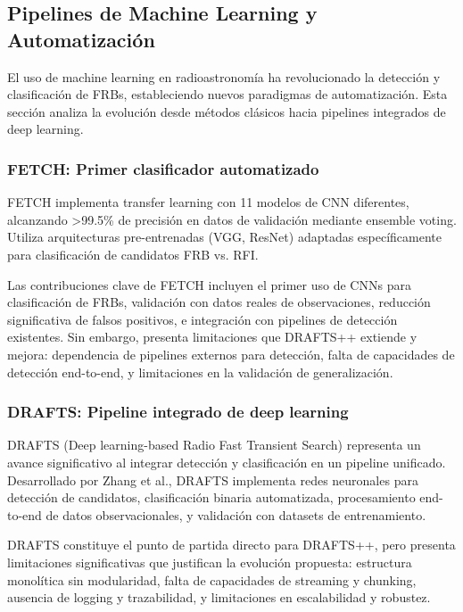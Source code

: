 \subsection{Pipelines de Machine Learning y Automatización}

El uso de machine learning en radioastronomía ha revolucionado la detección y clasificación de FRBs, estableciendo nuevos paradigmas de automatización. Esta sección analiza la evolución desde métodos clásicos hacia pipelines integrados de deep learning.

\subsubsection{FETCH: Primer clasificador automatizado}

FETCH \cite{Agarwal_2020} implementa transfer learning con 11 modelos de CNN diferentes, alcanzando >99.5\% de precisión en datos de validación mediante ensemble voting. Utiliza arquitecturas pre-entrenadas (VGG, ResNet) adaptadas específicamente para clasificación de candidatos FRB vs. RFI.

Las contribuciones clave de FETCH incluyen el primer uso de CNNs para clasificación de FRBs, validación con datos reales de observaciones, reducción significativa de falsos positivos, e integración con pipelines de detección existentes. Sin embargo, presenta limitaciones que DRAFTS++ extiende y mejora: dependencia de pipelines externos para detección, falta de capacidades de detección end-to-end, y limitaciones en la validación de generalización.

\subsubsection{DRAFTS: Pipeline integrado de deep learning}

DRAFTS (Deep learning-based Radio Fast Transient Search) \cite{zhang2024drafts} representa un avance significativo al integrar detección y clasificación en un pipeline unificado. Desarrollado por Zhang et al., DRAFTS implementa redes neuronales para detección de candidatos, clasificación binaria automatizada, procesamiento end-to-end de datos observacionales, y validación con datasets de entrenamiento.

DRAFTS constituye el punto de partida directo para DRAFTS++, pero presenta limitaciones significativas que justifican la evolución propuesta: estructura monolítica sin modularidad, falta de capacidades de streaming y chunking, ausencia de logging y trazabilidad, y limitaciones en escalabilidad y robustez.

